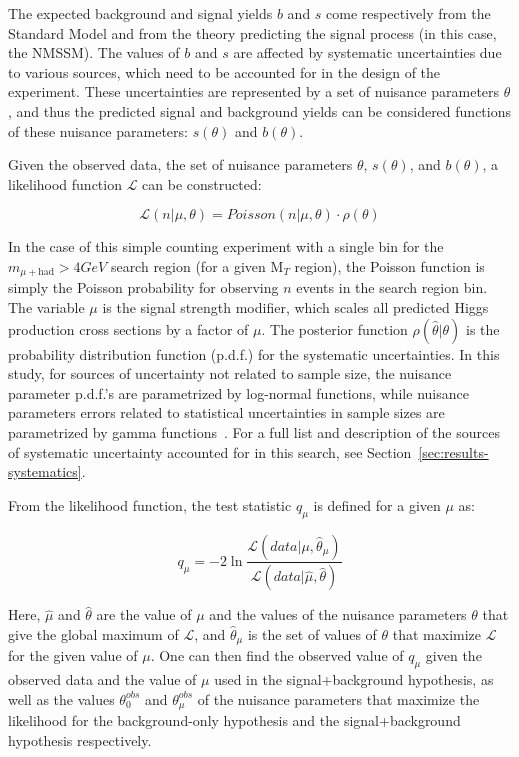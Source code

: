 The expected background and signal yields $b$ and $s$ come respectively from the Standard Model and from the theory predicting the signal process (in this case, the NMSSM). The values of $b$ and $s$ are affected by systematic uncertainties due to various sources, which need to be accounted for in the design of the experiment. These uncertainties are represented by a set of nuisance parameters $\theta$, and thus the predicted signal and background yields can be considered functions of these nuisance parameters: $s(\theta)$ and $b(\theta)$.

Given the observed data, the set of nuisance parameters $\theta$, $s(\theta)$, and $b(\theta)$, a likelihood function $\mathcal{L}$ can be constructed:

\begin{equation}
\mathcal{L}(n \vert \mu,\theta) = Poisson(n \vert \mu,\theta) \cdot \rho(\theta)
\label{eq:likelihood}
\end{equation}

In the case of this simple counting experiment with a single bin for the $m_{\mu+\text{had}} > 4 GeV$ search region (for a given M$_T$ region), the Poisson function is simply the Poisson probability for observing $n$ events in the search region bin. The variable $\mu$ is the signal strength modifier, which scales all predicted Higgs production cross sections by a factor of $\mu$. The posterior function $\rho(\hat{\theta} \vert \theta)$ is the probability distribution function (p.d.f.) for the systematic uncertainties. In this study, for sources of uncertainty not related to sample size, the nuisance parameter p.d.f.'s are parametrized by log-normal functions, while nuisance parameters errors related to statistical uncertainties in sample sizes are parametrized by gamma functions~\cite{CombinedTwiki}. For a full list and description of the sources of systematic uncertainty accounted for in this search, see Section~\ref{sec:results-systematics}.

From the likelihood function, the test statistic $q_{\mu}$ is defined for a given $\mu$ as:

\begin{equation}
q_{\mu} = -2\ln\frac{\mathcal{L}(data \vert \mu,\hat{\theta}_{\mu})}{\mathcal{L}(data \vert \hat{\mu},\hat{\theta})}
\label{eq:test-statistic}
\end{equation}

Here, $\hat{\mu}$ and $\hat{\theta}$ are the value of $\mu$ and the values of the nuisance parameters $\theta$ that give the global maximum of $\mathcal{L}$, and $\hat{\theta}_{\mu}$ is the set of values of $\theta$ that maximize $\mathcal{L}$ for the given value of $\mu$. One can then find the observed value of $q_{\mu}$ given the observed data and the value of $\mu$ used in the signal+background hypothesis, as well as the values $\theta^{obs}_{0}$ and $\theta^{obs}_{\mu}$ of the nuisance parameters that maximize the likelihood for the background-only hypothesis and the signal+background hypothesis respectively.


